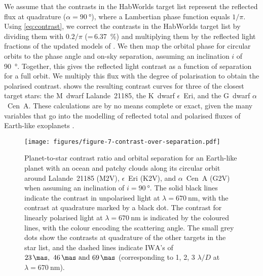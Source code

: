 \documentclass[usenatbib]{mnras}
\newcommand{\IWA}{\ensuremath{\mathrm{IWA}}\xspace}
\newcommand{\HWO}{HabWorlds\xspace}
\begin{document}
We assume that the contrasts in the \HWO target list represent the reflected flux at quadrature ($\alpha = \qty{90}{\degree}$), where a Lambertian phase function equals $1/\pi$. 
%
Using \cref{eq:contrast}, we correct the contrasts in the \HWO target list by dividing them with $0.2/\pi$ (=\,\qty{6.37}{\percent}) and multiplying them by the  reflected light fractions of the updated models of \citet{treesandstam2019}.
%
We then map the orbital phase for circular orbits to the phase angle and on-sky separation, assuming an inclination $i$ of \qty{90}{\degree}. 
%
Together, this gives the reflected light contrast as a function of separation for a full orbit.
%
We multiply this flux with the degree of polarisation to obtain the polarised contrast.
%
 shows the resulting contrast curves for three of the closest target stars: the M~dwarf Lalande~21185, the K~dwarf $\epsilon$~Eri, and the G~dwarf $\alpha$~Cen~A.
%
These calculations are by no means complete or exact, given the many variables that go into the modelling of reflected total and polarised fluxes of Earth-like exoplanets \citep{treesandstam2019,trees2022}.

\begin{figure*}
    \centering
    \texttt{[image: figures/figure-7-contrast-over-separation.pdf]}
    \caption{
        Planet-to-star contrast ratio and orbital separation for an Earth-like planet with an ocean and patchy clouds along its circular orbit  around Lalande~21185 (M2V), $\epsilon$~Eri (K2V), and $\alpha$~Cen~A (G2V) when assuming an inclination of $i = \qty{90}{\degree}$.
        The solid black lines indicate the contrast in unpolarised light at $\lambda = \qty{670}{\nano\meter}$, with the contrast at quadrature marked by a black dot.
        The contrast for linearly polarised light at $\lambda = \qty{670}{\nano\meter}$ is indicated by the coloured lines, with the colour encoding the scattering angle.
        The small grey dots show the contrasts at quadrature of the other targets in the star list, and the dashed lines indicate \IWA's of $\qtylist{23; 46; 69}{\mas}$ (corresponding to 1, 2, 3 $\lambda /D $ at $\lambda = \qty{670}{\nano\meter}$).
    }
    \label{fig:contrasts}
\end{figure*}
\end{document}
